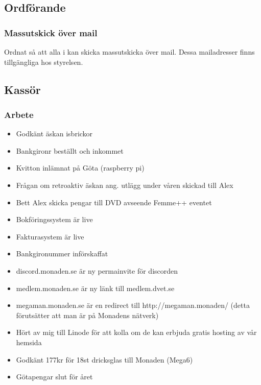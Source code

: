 \documentclass[protokoll]{dvd}
\begin{document}
\newpage

\subsection{Ordförande}

\subsubsection{Massutskick över mail}
Ordnat så att alla i \@dvet kan skicka massutskicka över mail. Dessa mailadresser finns tillgängliga hos styrelsen.

\subsection{Kassör}
    \subsubsection{Arbete}
        \begin{itemize}
            \item Godkänt äskan isbrickor
            \item Bankgironr beställt och inkommet
            \item Kvitton inlämnat på Göta (raspberry pi) 
            \item Frågan om retroaktiv äskan ang. utlägg under våren skickad till Alex
            \item Bett Alex skicka pengar till DVD avseende Femme++ eventet
            \item Bokföringssystem är live
            \item Fakturasystem är live
            \item Bankgironummer införskaffat
            \item discord.monaden.se är ny permainvite för discorden
            \item medlem.monaden.se är ny länk till medlem.dvet.se
            \item megaman.monaden.se är en redirect till http://megaman.monaden/ (detta förutsätter att man är på Monadens nätverk)
            \item Hört av mig till Linode för att kolla om de kan erbjuda gratis hosting av vår hemsida
            \item Godkänt 177kr för 18st dricksglas till Monaden (Mega6) 
            \item Götapengar slut för året
        \end{itemize}
\end{document}
